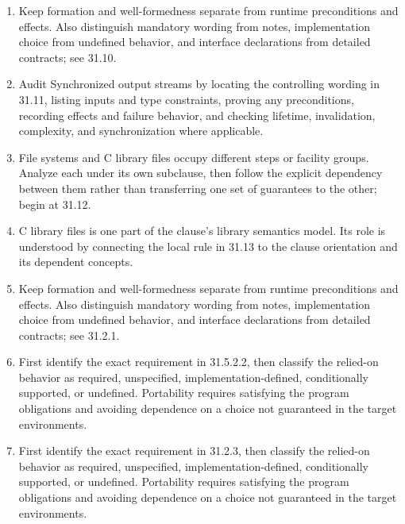 \documentclass[11pt,letterpaper]{article}
\begin{document}
\begin{enumerate}
\item Keep formation and well-formedness separate from runtime preconditions and effects. Also distinguish mandatory wording from notes, implementation choice from undefined behavior, and interface declarations from detailed contracts; see 31.10.
\item Audit Synchronized output streams by locating the controlling wording in 31.11, listing inputs and type constraints, proving any preconditions, recording effects and failure behavior, and checking lifetime, invalidation, complexity, and synchronization where applicable.
\item File systems and C library files occupy different steps or facility groups. Analyze each under its own subclause, then follow the explicit dependency between them rather than transferring one set of guarantees to the other; begin at 31.12.
\item C library files is one part of the clause's library semantics model. Its role is understood by connecting the local rule in 31.13 to the clause orientation and its dependent concepts.
\item Keep formation and well-formedness separate from runtime preconditions and effects. Also distinguish mandatory wording from notes, implementation choice from undefined behavior, and interface declarations from detailed contracts; see 31.2.1.
\item First identify the exact requirement in 31.5.2.2, then classify the relied-on behavior as required, unspecified, implementation-defined, conditionally supported, or undefined. Portability requires satisfying the program obligations and avoiding dependence on a choice not guaranteed in the target environments.
\item First identify the exact requirement in 31.2.3, then classify the relied-on behavior as required, unspecified, implementation-defined, conditionally supported, or undefined. Portability requires satisfying the program obligations and avoiding dependence on a choice not guaranteed in the target environments.
\end{enumerate}
\end{document}
